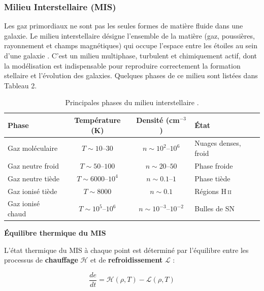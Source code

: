 \documentclass{article}
\begin{document}
\subsubsection{Milieu Interstellaire (\textbf{MIS})}
Les gaz primordiaux ne sont pas les seules formes de matière fluide dans une galaxie. Le milieu interstellaire désigne l'ensemble de la matière (gaz, poussières, rayonnement et champs magnétiques) qui occupe l'espace entre les étoiles au sein d'une galaxie \cite{Tormen1996}. C'est un milieu multiphase, turbulent et chimiquement actif, dont la modélisation est indispensable pour
reproduire correctement la formation stellaire et l'évolution des galaxies. Quelques phases de ce milieu sont listées dans Tableau 2. 
\begin{table}[h!]
\centering
\renewcommand{\arraystretch}{1.4}
\begin{tabular}{lccl}
\hline
\textbf{Phase} & \textbf{Température (K)} 
               & \textbf{Densité (cm$^{-3}$)} & \textbf{État} \\
\hline
Gaz moléculaire     & $T \sim 10$--$30$       
                    & $n \sim 10^2$--$10^6$   & Nuages denses, froid \\
Gaz neutre froid    & $T \sim 50$--$100$      
                    & $n \sim 20$--$50$        & Phase froide  \\
Gaz neutre tiède    & $T \sim 6000$--$10^4$   
                    & $n \sim 0.1$--$1$        & Phase tiède \\
Gaz ionisé tiède    & $T \sim 8000$           
                    & $n \sim 0.1$             & Régions H\,\textsc{ii} \\
Gaz ionisé chaud    & $T \sim 10^5$--$10^6$   
                    & $n \sim 10^{-3}$--$10^{-2}$ & Bulles de SN \\
\hline
\end{tabular}
\caption{Principales phases du milieu interstellaire 
         \cite{McKee1977, Ferriere2001}.}
\label{tab:phases_MIS}
\end{table}


\textbf{Équilibre thermique du MIS}


L'état thermique du MIS à chaque point est déterminé par l'équilibre
entre les processus de \textbf{chauffage} $\mathcal{H}$ et de
\textbf{refroidissement} $\mathcal{L}$ :

\begin{equation}
    \frac{de}{dt} = \mathcal{H}(\rho, T) - \mathcal{L}(\rho, T)
    \label{eq:equilibre_thermique}
\end{equation}
\end{document}
